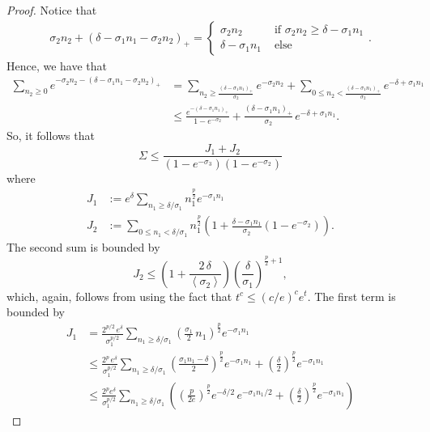 \documentclass[10pt,a4paper]{amsart}
\newcommand		{\bangle}[1]	{\lt\langle #1\rt\rangle}
\newcommand		{\lt}			{\left}				%
\newcommand		{\rt}			{\right}			%
\newcommand		{\weight}[1]	{\bangle{#1}}	%
\begin{document}
\begin{proof}
		Notice that 
        \begin{align*}
        \sigma_2 n_2 + (\delta - \sigma_1 n_1 - \sigma_2 n_2)_+=
            \begin{cases}
                \sigma_2 n_2 & \text{ if } \sigma_2 n_2 \geq \delta -\sigma_1 n_1
                \\
                \delta-\sigma_1 n_1 & \text{ else}
            \end{cases}.
        \end{align*}
        Hence, we have that
		\begin{align*}
			\sum_{n_2\geq 0} e^{-\sigma_2 n_2 - (\delta-\sigma_1 n_1-\sigma_2 n_2)_+} &= \sum_{n_2\geq \frac{(\delta-\sigma_1 n_1)_+}{\sigma_2}} e^{-\sigma_2 n_2} + \sum_{0\leq n_2 < \frac{(\delta-\sigma_1 n_1)_+}{\sigma_2}} e^{ - \delta+\sigma_1 n_1}
			\\
			&\leq \frac{e^{- (\delta-\sigma_1 n_1)_+}}{1-e^{-\sigma_2}} +  \frac{(\delta-\sigma_1 n_1)_+}{\sigma_2} \, e^{- \delta+\sigma_1 n_1} .
		\end{align*}
		So, it follows that
		\begin{equation*}
			\Sigma \leq \frac{J_1 + J_2}{\lt(1-e^{-\sigma_3}\rt)\lt(1-e^{-\sigma_2}\rt)}
		\end{equation*}
		where
		\begin{align*}
			J_1 &:= e^\delta \sum_{n_1\geq \delta/\sigma_1}  n_1^\frac{p}{2} e^{-\sigma_1 n_1}
			\\
			J_2 &:= \sum_{0\leq n_1 < \delta/\sigma_1}  n_1^\frac{p}{2} \lt(1 + \frac{\delta-\sigma_1 n_1}{\sigma_2}\lt(1-e^{-\sigma_2}\rt)\rt) .
		\end{align*}
		The second sum is bounded by
		\begin{equation*}
			J_2 \leq \lt(1+\frac{2\,\delta}{\weight{\sigma_2}}\rt) \lt(\frac{\delta}{\sigma_1}\rt)^{\frac{p}{2}+1} ,
		\end{equation*}
		which, again, follows from using the fact that $t^c \leq \lt(c/e\rt)^c e^t$. The first term is bounded by
		\begin{align*}
			J_1 &= \frac{2^{p/2}\,e^\delta}{\sigma_1^{p/2}}\sum_{n_1\geq \delta/\sigma_1} \lt(\tfrac{\sigma_1}{2}\,n_1\rt)^\frac{p}{2} e^{-\sigma_1 n_1}
			\\
			&\leq \frac{2^{p}\,e^\delta}{\sigma_1^{p/2}} \sum_{n_1\geq \delta/\sigma_1} \lt(\tfrac{\sigma_1 n_1 - \delta}{2}\rt)^\frac{p}{2} e^{-\sigma_1 n_1} + \lt(\tfrac{\delta}{2}\rt)^\frac{p}{2} e^{-\sigma_1 n_1}
			\\
			&\leq \frac{2^p e^\delta}{\sigma_1^{p/2}}\sum_{n_1\geq \delta/\sigma_1} \lt(\lt(\tfrac{p}{2e}\rt)^\frac{p}{2} e^{-\delta/2}\, e^{-\sigma_1 n_1/2} + \lt(\tfrac{\delta}{2}\rt)^\frac{p}{2} e^{-\sigma_1 n_1} \rt)

\end{align*}
\end{proof}
\end{document}
